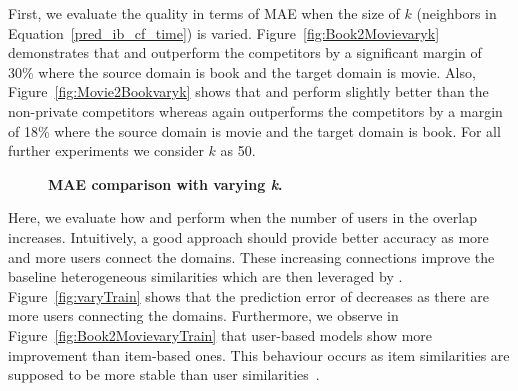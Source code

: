 First, we evaluate the quality in terms of MAE when the size of $k$ (neighbors in Equation~\ref{pred_ib_cf_time}) is varied. Figure~\ref{fig:Book2Movievaryk} demonstrates that \crossrecub and \npcrossrecub outperform the competitors by a significant margin of 30\% where the source domain is book and the target domain is movie. Also, Figure~\ref{fig:Movie2Bookvaryk} shows that \crossrecub and \crossrecib perform slightly better than the non-private competitors whereas \npcrossrec again outperforms the competitors by a margin of 18\% where the source domain is movie and the target domain is book. For all further experiments we consider $k$ as 50.

\begin{figure}[ht]
\vspace{-3mm}
\hspace{-1em}
\vspace{-6mm}
\caption{\bf MAE comparison with varying \emph{k}.}
\vspace{1mm}
\label{fig:varyK}
\end{figure}

Here, we evaluate how \crossrec and \npcrossrec perform when the number of users in the overlap increases. Intuitively, a good approach should provide better accuracy as more and more users connect the domains. These increasing connections improve the baseline heterogeneous similarities which are then leveraged by \graphsim. Figure~\ref{fig:varyTrain} shows that the prediction error of \crossrec decreases as there are more users connecting the domains. Furthermore, we observe in Figure~\ref{fig:Book2MovievaryTrain} that user-based models show more improvement than item-based ones. This behaviour occurs as item similarities are supposed to be more stable than user similarities~\cite{jannach2010recommender}.

